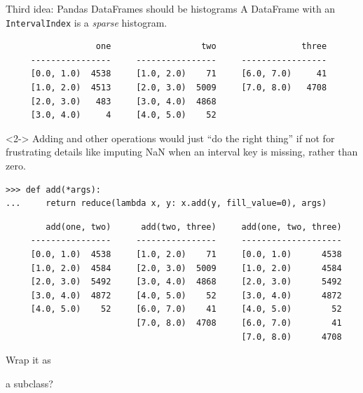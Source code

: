 \documentclass[aspectratio=169]{beamer}
\begin{document}
\begin{frame}[fragile]{Third idea: Pandas DataFrames should be histograms}
\vspace{-0.15 cm}
A DataFrame with an {\tt\normalsize IntervalIndex} is a {\it sparse} histogram.

\scriptsize
\vspace{-0.35 cm}
\begin{verbatim}
                  one                  two                 three
     ----------------     ----------------     -----------------
     [0.0, 1.0)  4538     [1.0, 2.0)    71     [6.0, 7.0)     41
     [1.0, 2.0)  4513     [2.0, 3.0)  5009     [7.0, 8.0)   4708
     [2.0, 3.0)   483     [3.0, 4.0)  4868
     [3.0, 4.0)     4     [4.0, 5.0)    52
\end{verbatim}

\normalsize
\vspace{-0.15 cm}
\begin{uncoverenv}<2->
Adding and other operations would just ``do the right thing'' if not for frustrating details like imputing NaN when an interval key is missing, rather than zero.

\scriptsize
\begin{verbatim}
>>> def add(*args):
...     return reduce(lambda x, y: x.add(y, fill_value=0), args)
\end{verbatim}

\scriptsize
\vspace{-0.35 cm}
\begin{verbatim}
        add(one, two)      add(two, three)     add(one, two, three)
     ----------------     ----------------     --------------------
     [0.0, 1.0)  4538     [1.0, 2.0)    71     [0.0, 1.0)      4538
     [1.0, 2.0)  4584     [2.0, 3.0)  5009     [1.0, 2.0)      4584
     [2.0, 3.0)  5492     [3.0, 4.0)  4868     [2.0, 3.0)      5492
     [3.0, 4.0)  4872     [4.0, 5.0)    52     [3.0, 4.0)      4872
     [4.0, 5.0)    52     [6.0, 7.0)    41     [4.0, 5.0)        52
                          [7.0, 8.0)  4708     [6.0, 7.0)        41
                                               [7.0, 8.0)      4708
\end{verbatim}

\vspace{-3.75 cm}
\large
\hfill Wrap it \mbox{as\hspace{0.3 cm}}

\hfill a subclass?
\end{uncoverenv}

\vspace{1.75 cm}
\end{frame}
\end{document}
